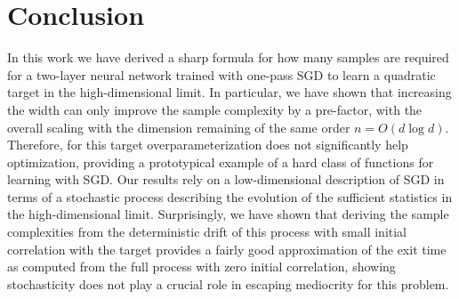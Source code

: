 \section{Conclusion}

\label{2305:sec:conclusion}
In this work we have derived a sharp formula for how many samples are required for a two-layer neural network trained with one-pass SGD to learn a quadratic target in the high-dimensional limit. In particular, we have shown that increasing the width can only improve the sample complexity by a pre-factor, with the overall scaling with the dimension remaining of the same order $n=O(d\log{d})$. Therefore, for this target overparameterization does not significantly help optimization, providing a prototypical example of a hard class of functions for learning with SGD. Our results rely on a low-dimensional description of SGD in terms of a stochastic process describing the evolution of the sufficient statistics in the high-dimensional limit. Surprisingly, we have shown that deriving the sample complexities from the deterministic drift of this process with small initial correlation with the target provides a fairly good approximation of the exit time as computed from the full process with zero initial correlation, showing stochasticity does not play a crucial role in escaping mediocrity for this problem.
